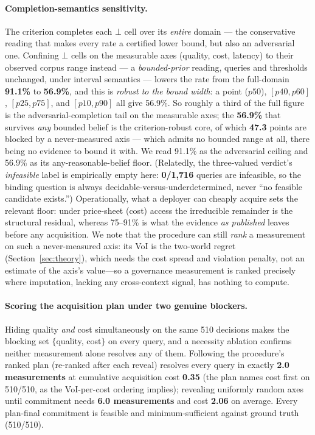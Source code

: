 \documentclass{article} %
\newcommand{\bbot}{\bot}
\begin{document}
\paragraph{Completion-semantics sensitivity.}
The criterion completes each $\bbot$ cell over its \emph{entire} domain --- the conservative reading that makes every rate a certified lower bound, but also an adversarial one. Confining $\bbot$ cells on the measurable axes (quality, cost, latency) to their observed corpus range instead --- a \emph{bounded-prior} reading, queries and thresholds unchanged, under interval semantics --- lowers the rate from the full-domain \textbf{91.1\%} to \textbf{56.9\%}, and this is \emph{robust to the bound width}: a point ($p50$), $[p40,p60]$, $[p25,p75]$, and $[p10,p90]$ all give 56.9\%. So roughly a third of the full figure is the adversarial-completion tail on the measurable axes; the \textbf{56.9\%} that survives \emph{any} bounded belief is the criterion-robust core, of which \textbf{47.3} points are blocked by a never-measured axis --- which admits no bounded range at all, there being no evidence to bound it with. We read 91.1\% as the adversarial ceiling and 56.9\% as its any-reasonable-belief floor. (Relatedly, the three-valued verdict's \emph{infeasible} label is empirically empty here: \textbf{0/1{,}716} queries are infeasible, so the binding question is always decidable-versus-underdetermined, never ``no feasible candidate exists.'') Operationally, what a deployer can cheaply acquire sets the relevant floor: under price-sheet (cost) access the irreducible remainder is the structural residual, whereas 75--91\% is what the evidence \emph{as published} leaves before any acquisition. We note that the procedure can still \emph{rank} a measurement on such a never-measured axis: its VoI is the two-world regret (Section~\ref{sec:theory}), which needs the cost spread and violation penalty, not an estimate of the axis's value---so a governance measurement is ranked precisely where imputation, lacking any cross-context signal, has nothing to compute.

\paragraph{Scoring the acquisition plan under two genuine blockers.}
Hiding quality \emph{and} cost simultaneously on the same 510 decisions makes the blocking set $\{$quality, cost$\}$ on every query, and a necessity ablation confirms neither measurement alone resolves any of them. Following the procedure's ranked plan (re-ranked after each reveal) resolves every query in exactly \textbf{2.0 measurements} at cumulative acquisition cost \textbf{0.35} (the plan names cost first on 510/510, as the VoI-per-cost ordering implies); revealing uniformly random axes until commitment needs \textbf{6.0 measurements} and cost \textbf{2.06} on average. Every plan-final commitment is feasible and minimum-sufficient against ground truth (510/510).
\end{document}
